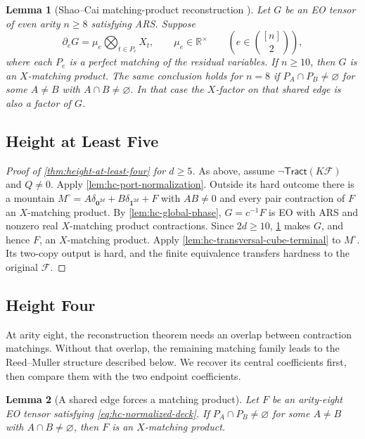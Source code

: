 \documentclass[11pt,letterpaper,onecolumn]{article}
\theoremstyle{plain}
\newtheorem{lemma}[lemma]{Lemma}
\theoremstyle{definition}
\theoremstyle{remark}
\newcommand{\cF}{\mathcal F}
\newcommand{\Tract}{\mathsf{Tract}}
\newcommand{\one}{\mathbf 1}
\newcommand{\zero}{\mathbf 0}
\begin{document}
	\begin{lemma}[Shao--Cai matching-product reconstruction
		{\cite[full version, Lemma~2.11]{ShaoCai2020}}]
		\label{lem:sc-x-product-reconstruction}
		Let \(G\) be an EO tensor of even arity \(n\ge8\) satisfying ARS.
		Suppose
		\[
		\partial_eG=\mu_e\bigotimes_{t\in P_e}X_t,
		\qquad \mu_e\in\mathbb R^\times
		\qquad\left(e\in\binom{[n]}2\right),
		\]
		where each \(P_e\) is a perfect matching of the residual variables.
		If \(n\ge10\), then \(G\) is an \(X\)-matching product.
		The same conclusion holds for \(n=8\) if \(P_A\cap P_B\ne\varnothing\)
		for some \(A\ne B\) with \(A\cap B\ne\varnothing\). In that case the
		\(X\)-factor on that shared edge is also a factor of \(G\).
	\end{lemma}
	
	\subsection{Height at Least Five}
	\label{subsec:height-at-least-five}
	
	\begin{proof}[Proof of \cref{thm:height-at-least-four} for \(d\ge5\)]
		As above, assume \(\neg\Tract(K\cF)\) and \(Q\ne0\).
		Apply \cref{lem:hc-port-normalization}.  Outside its hard outcome there
		is a mountain
		\(M^\circ=A\delta_{\zero^{2d}}+B\delta_{\one^{2d}}+F\)
		with \(AB\ne0\) and every pair contraction of \(F\) an
		\(X\)-matching product.
		By \cref{lem:hc-global-phase}, \(G=c^{-1}F\) is EO with ARS
		and nonzero real \(X\)-matching product contractions.  Since \(2d\ge10\),
		\cref{lem:sc-x-product-reconstruction} makes \(G\), and hence \(F\),
		an \(X\)-matching product.
		Apply \cref{lem:hc-transversal-cube-terminal} to
		\(M^\circ\).  Its two-copy output is hard, and the finite equivalence
		transfers hardness to the original \(\cF\).
	\end{proof}
	
	\subsection{Height Four}
	\label{subsec:height-four}

	At arity eight, the reconstruction theorem needs an overlap between
	contraction matchings. Without that overlap, the remaining matching family
	leads to the Reed--Muller structure described below. We recover its central
	coefficients first, then compare them with the two endpoint coefficients.
	
	
	\begin{lemma}[A shared edge forces a matching product]
		\label{lem:q8-scope-collision}
		Let \(F\) be an arity-eight EO tensor satisfying
		\eqref{eq:hc-normalized-deck}.
		If \(P_A\cap P_B\ne\varnothing\) for some \(A\ne B\) with
		\(A\cap B\ne\varnothing\), then \(F\) is an \(X\)-matching product.
	\end{lemma}
	
\end{document}
